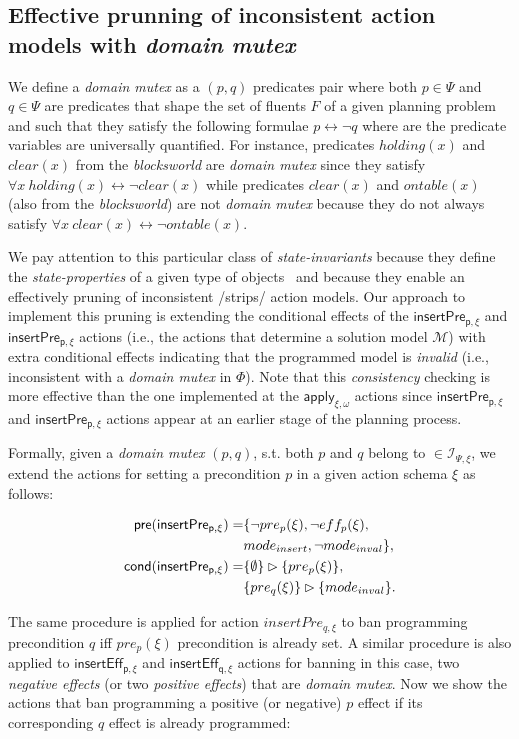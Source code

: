 \documentclass{article}
\newcommand{\pre}{\mathsf{pre}}     %
\newcommand{\cond}{\mathsf{cond}}   %
\begin{document}
\subsection{Effective prunning of inconsistent action models with {\em domain mutex}}
We define a {\em domain mutex} as a $(p,q)$ predicates pair where both $p\in\Psi$ and $q\in\Psi$ are predicates that shape the set of fluents $F$ of a given planning problem and such that they satisfy the following formulae $p\leftrightarrow \neg q$ where are the predicate variables are universally quantified. For instance, predicates $holding(x)$ and $clear(x)$ from the {\em blocksworld} are {\em domain mutex} since they satisfy $\forall x\ holding(x)\leftrightarrow\neg clear(x)$ while predicates $clear(x)$ and $ontable(x)$ (also from the {\em blocksworld}) are not {\em domain mutex} because they do not always satisfy $\forall x\ clear(x)\leftrightarrow\neg ontable(x)$.

We pay attention to this particular class of {\em state-invariants} because they define the {\em state-properties} of a given type of objects~\cite{fox:TIM:JAIR1998} and because they enable an effectively pruning of inconsistent /strips/ action models. Our approach to implement this pruning is extending the conditional effects of the $\mathsf{insertPre_{p,\xi}}$ and $\mathsf{insertPre_{p,\xi}}$ actions (i.e., the actions that determine a solution model $\mathcal{M}$) with extra conditional effects indicating that the programmed model is {\em invalid} (i.e., inconsistent with a {\em domain mutex} in $\Phi$). Note that this {\em consistency} checking is more effective than the one implemented at the $\mathsf{apply_{\xi,\omega}}$ actions since $\mathsf{insertPre_{p,\xi}}$ and $\mathsf{insertPre_{p,\xi}}$ actions appear at an earlier stage of the planning process.

Formally, given a {\em domain mutex} $(p,q)$, s.t. both $p$ and $q$ belong to $\in{\mathcal I}_{\Psi,\xi}$, we extend the actions for setting a precondition $p$ in a given action schema $\xi$ as follows:

\begin{small}
\begin{align*}
\hspace*{7pt}\pre(\mathsf{insertPre_{p,\xi}})=&\{\neg pre_{p}(\xi), \neg eff_{p}(\xi),\\
&mode_{insert},\neg mode_{inval}\},\\
\cond(\mathsf{insertPre_{p,\xi}})=&\{\emptyset\}\rhd\{pre_{p}(\xi)\},\\
&\{pre_{q}(\xi)\}\rhd\{mode_{inval}\}.
\end{align*}
\end{small}
The same procedure is applied for action $insertPre_{q,\xi}$ to ban programming precondition $q$ iff $pre_{p}(\xi)$ precondition is already set. A similar procedure is also applied to $\mathsf{insertEff_{p,\xi}}$ and $\mathsf{insertEff_{q,\xi}}$ actions for banning in this case, two {\em negative effects} (or two {\em positive effects}) that are {\em domain mutex}. Now we show the actions that ban programming a positive (or negative) $p$ effect if its corresponding $q$ effect is already programmed:
\end{document}
